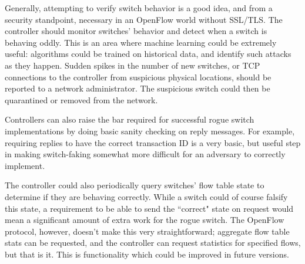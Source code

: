 Generally, attempting to verify switch behavior is a good idea, and from a security standpoint, necessary in an OpenFlow world without SSL/TLS. The controller should monitor switches' behavior and detect when a switch is behaving oddly. This is an area where machine learning could be extremely useful: algorithms could be trained on historical data, and identify such attacks as they happen. Sudden spikes in the number of new switches, or TCP connections to the controller from suspicious physical locations, should be reported to a network administrator. The suspicious switch could then be quarantined or removed from the network.

Controllers can also raise the bar required for successful rogue switch implementations by doing basic sanity checking on reply messages. For example, requiring replies to have the correct transaction ID is a very basic, but useful step in making switch-faking somewhat more difficult for an adversary to correctly implement.

The controller could also periodically query switches' flow table state to determine if they are behaving correctly. While a switch could of course falsify this state, a requirement to be able to send the ``correct" state on request would mean a significant amount of extra work for the rogue switch. The OpenFlow protocol, however, doesn't make this very straightforward; aggregate flow table stats can be requested, and the controller can request statistics for specified flows, but that is it. This is functionality which could be improved in future versions.

